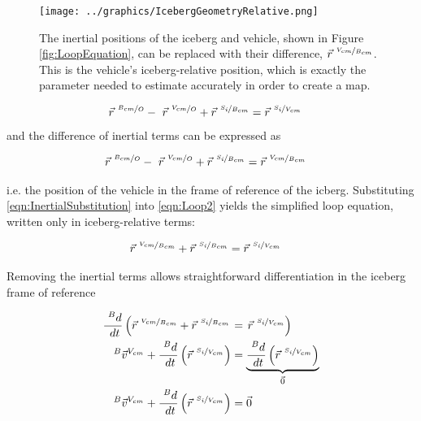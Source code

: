 \begin{figure}[htbp]
   \centering
   \texttt{[image: ../graphics/IcebergGeometryRelative.png]} %
   \caption{The inertial positions of the iceberg and vehicle, shown in Figure \ref{fig:LoopEquation}, can be replaced with their difference, $ \vec{r}^{~\nicefrac{V_{cm}}{B_{cm}}}$. This is the vehicle's iceberg-relative position, which is exactly the parameter needed to estimate accurately in order to create a map. }
    \label{fig:LoopEquationBergFrame}
\end{figure}

\begin{align}
\vec{r}^{~\nicefrac{B_{cm}}{O}}  - ~\vec{r}^{~\nicefrac{V_{cm}}{O}} + \vec{r}^{~\nicefrac{S_i}{B_{cm}}} &= \vec{r}^{~\nicefrac{S_i}{V_{cm}}}
\label{eqn:Loop2}
\end{align}
and the difference of inertial terms can be expressed as 

\begin{align}
\vec{r}^{~\nicefrac{B_{cm}}{O}}  - ~\vec{r}^{~\nicefrac{V_{cm}}{O}} + \vec{r}^{~\nicefrac{S_i}{B_{cm}}} &= \vec{r}^{~\nicefrac{V_{cm}}{B_{cm}}}
\label{eqn:InertialSubstitution}
\end{align}

i.e. the position of the vehicle in the frame of reference of the icberg. Substituting \ref{eqn:InertialSubstitution} into \ref{eqn:Loop2} yields the simplified loop equation, written only in iceberg-relative terms:

\begin{align}
\vec{r}^{~\nicefrac{V_{cm}}{B_{cm}}}+ \vec{r}^{~\nicefrac{S_i}{B_{cm}}} &= \vec{r}^{~\nicefrac{S_i}{V_{cm}}}
\label{eqn:IcebergLoop}
\end{align}

Removing the inertial terms allows straightforward differentiation in the iceberg frame of reference


\begin{align} %
   \frac{~^Bd}{~dt}\left(\vec{r}^{~\nicefrac{V_{cm}}{B_{cm}}}+ \vec{r}^{~\nicefrac{S_i}{B_{cm}}}\right.& =\left. \vec{r}^{~\nicefrac{S_i}{V_{cm}}}\right)\\
   ~^B\vec{v}^{V_{cm}}  + \frac{~^Bd}{~dt}\left(\vec{r}^{~\nicefrac{S_{i}}{V_{cm}}}\right) &= \underbrace{\frac{~^Bd}{~dt}\left(\vec{r}^{~\nicefrac{S_i}{V_{cm}}}\right)}_{\vec{0}} \\
   ~^B\vec{v}^{V_{cm}}  + \frac{~^Bd}{~dt}\left(\vec{r}^{~\nicefrac{S_{i}}{V_{cm}}}\right) &= \vec{0}
   \label{eqn:dLoopdB}
\end{align}

